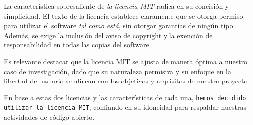 La característica sobresaliente de \textit{la licencia MIT} radica en su concisión y simplicidad. El texto de la 
licencia establece claramente que se otorga permiso para utilizar el software \textit{tal como está}, sin otorgar 
garantías de ningún tipo. Además, se exige la inclusión del aviso de copyright y la exención de 
responsabilidad en todas las copias del software.

Es relevante destacar que la licencia MIT se ajusta de manera óptima a nuestro caso de investigación, dado 
que su naturaleza permisiva y su enfoque en la libertad del usuario se alinean con los objetivos y requisitos de 
nuestro proyecto. 

En base a estas dos licencias y las características de cada una, \texttt{hemos decidido utilizar la licencia MIT}, confiando en su idoneidad para respaldar nuestras actividades de código abierto.


